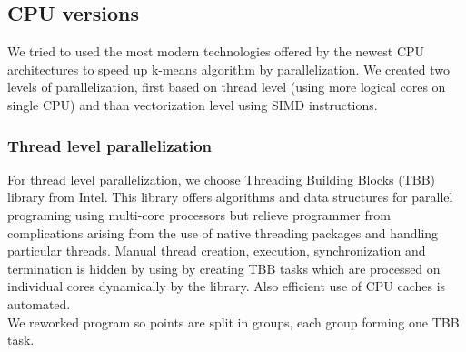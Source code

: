 \subsection{CPU versions}
We tried to used the most modern technologies offered by the newest CPU architectures to speed up k-means algorithm by parallelization. We created two levels of parallelization, first based on thread level (using more logical cores on single CPU) and than vectorization level using SIMD instructions.

\subsubsection{Thread level parallelization}
For thread level parallelization, we choose Threading Building Blocks (TBB) library from Intel. This library offers algorithms and data structures for parallel programing using multi-core processors but relieve programmer from complications arising from the use of native threading packages and handling particular threads. Manual thread creation, execution, synchronization and termination is hidden by using by creating TBB tasks which are processed on individual cores dynamically by the library. Also efficient use of CPU caches is automated.\\
We reworked program so points are split in groups, each group forming one TBB task.\\
